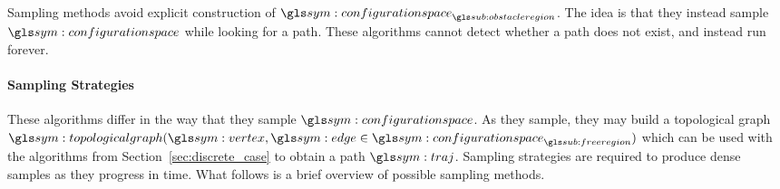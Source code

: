 			Sampling methods avoid explicit construction of
			$\configurationspace_{\obstacleregion}$. The idea is that they
			instead sample $\configurationspace$ while looking for a path. These
			algorithms cannot detect whether a path does not exist, and instead
			run forever.

			\paragraph{Sampling Strategies}%
			\label{sec:sampling_strategies}

				These algorithms differ in the way that they sample
				$\configurationspace$. As they sample, they may build a
				topological graph \( \topologicalgraph(\vertex, \edge \in
				\configurationspace_{\freeregion}) \) which can be used with the
				algorithms from Section~\ref{sec:discrete_case} to obtain a path
				$\pathsym$.  Sampling strategies are required to produce dense
				samples as they progress in time.  What follows is a brief
				overview of possible sampling methods.

